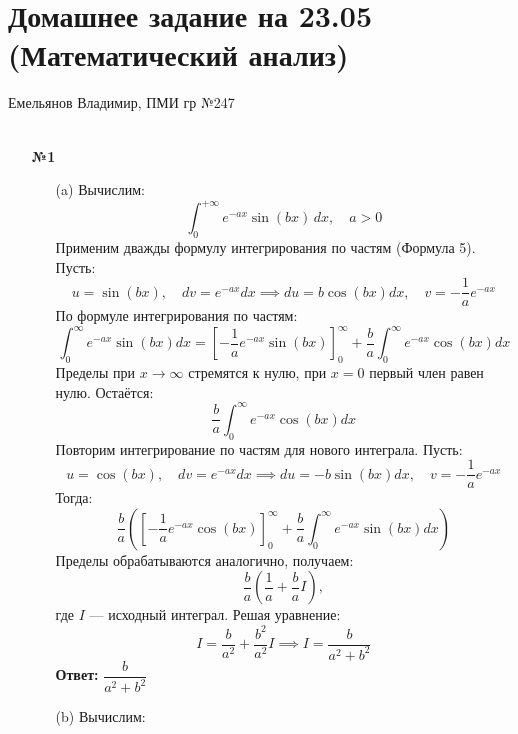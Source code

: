 \documentclass[a4paper]{article}
\begin{document}
\section*{Домашнее задание на 23.05 (Математический анализ)}
{\large Емельянов Владимир, ПМИ гр №247}\\\\
\begin{enumerate}
  \item[\textbf{№1}]\begin{enumerate}
    \item[(a)]Вычислим:
    \[\displaystyle\int_{0}^{+\infty} e^{-ax} \sin(bx) \, dx, \quad a > 0\]
    Применим дважды формулу интегрирования по частям (Формула 5). Пусть:
    \[
    u = \sin(bx), \quad dv = e^{-ax} dx \implies du = b \cos(bx) dx, 
    \quad v = -\frac{1}{a} e^{-ax}
    \]
    По формуле интегрирования по частям:
    \[
    \int_{0}^{\infty} e^{-ax} \sin(bx) dx = 
    \left[ -\frac{1}{a} e^{-ax} \sin(bx) \right]_0^{\infty}
     + \frac{b}{a} \int_{0}^{\infty} e^{-ax} \cos(bx) dx
    \]
    Пределы при \(x \to \infty\) стремятся к нулю, при \(x=0\) первый член равен нулю. Остаётся:
    \[
    \frac{b}{a} \int_{0}^{\infty} e^{-ax} \cos(bx) dx
    \]
    Повторим интегрирование по частям для нового интеграла. Пусть:
    \[
    u = \cos(bx), \quad dv = e^{-ax} dx \implies du = -b 
    \sin(bx) dx, \quad v = -\frac{1}{a} e^{-ax}
    \]
    Тогда:
    \[
    \frac{b}{a} \left( \left[ -\frac{1}{a} e^{-ax} \cos(bx) 
    \right]_0^{\infty} + \frac{b}{a} \int_{0}^{\infty} e^{-ax} \sin(bx) dx \right)
    \]
    Пределы обрабатываются аналогично, получаем:
    \[
    \frac{b}{a} \left( \frac{1}{a} + \frac{b}{a} I \right),
    \]
    где \(I\) — исходный интеграл. Решая уравнение:
    \[
    I = \frac{b}{a^2} + \frac{b^2}{a^2} I \implies I = \frac{b}{a^2 + b^2}
    \]
    \textbf{Ответ:} \(\dfrac{b}{a^2 + b^2}\)

    \item[(b)]Вычислим:
    
  \end{enumerate}
\end{enumerate}
\end{document}
